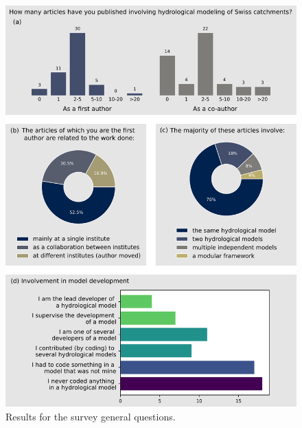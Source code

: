 \documentclass[10pt,a4paper]{article}
\begin{document}
\begin{figure}[htbp]
	\begin{center}
		\includegraphics[width=0.90\columnwidth]{figures/survey_general.pdf}
		\caption{{Results for the survey general questions.
		{\label{fig:survey_general}}
		}}
	\end{center}
\end{figure}
\end{document}
